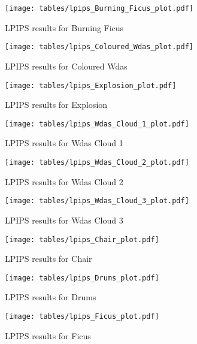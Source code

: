\begin{figure}[h!]
\centering
\texttt{[image: tables/lpips\_Burning\_Ficus\_plot.pdf]}
\caption{LPIPS results for Burning Ficus}
\label{fig:ap_lpips_Burning Ficus_plot}
\end{figure}

\begin{figure}[h!]
\centering
\texttt{[image: tables/lpips\_Coloured\_Wdas\_plot.pdf]}
\caption{LPIPS results for Coloured Wdas}
\label{fig:ap_lpips_Coloured Wdas_plot}
\end{figure}

\begin{figure}[h!]
\centering
\texttt{[image: tables/lpips\_Explosion\_plot.pdf]}
\caption{LPIPS results for Explosion}
\label{fig:ap_lpips_Explosion_plot}
\end{figure}

\begin{figure}[h!]
\centering
\texttt{[image: tables/lpips\_Wdas\_Cloud\_1\_plot.pdf]}
\caption{LPIPS results for Wdas Cloud 1}
\label{fig:ap_lpips_Wdas Cloud 1_plot}
\end{figure}

\begin{figure}[h!]
\centering
\texttt{[image: tables/lpips\_Wdas\_Cloud\_2\_plot.pdf]}
\caption{LPIPS results for Wdas Cloud 2}
\label{fig:ap_lpips_Wdas Cloud 2_plot}
\end{figure}

\begin{figure}[h!]
\centering
\texttt{[image: tables/lpips\_Wdas\_Cloud\_3\_plot.pdf]}
\caption{LPIPS results for Wdas Cloud 3}
\label{fig:ap_lpips_Wdas Cloud 3_plot}
\end{figure}

\begin{figure}[h!]
\centering
\texttt{[image: tables/lpips\_Chair\_plot.pdf]}
\caption{LPIPS results for Chair}
\label{fig:ap_lpips_Chair_plot}
\end{figure}

\begin{figure}[h!]
\centering
\texttt{[image: tables/lpips\_Drums\_plot.pdf]}
\caption{LPIPS results for Drums}
\label{fig:ap_lpips_Drums_plot}
\end{figure}

\begin{figure}[h!]
\centering
\texttt{[image: tables/lpips\_Ficus\_plot.pdf]}
\caption{LPIPS results for Ficus}
\label{fig:ap_lpips_Ficus_plot}
\end{figure}

